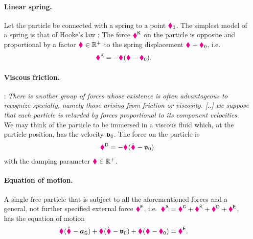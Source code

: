 \paragraph{Linear spring.}
Let the particle be connected with a spring to a point $\particlePos{0}$.
The simplest model of a spring is that of Hooke's law \cite{Hooke:OfSprings}: The force $\particleForceStiff{}$ on the particle is opposite and proportional by a factor $\particleStiffness{} \in \RealNum^+$ to the spring displacement $\particlePos{} - \particlePos{0}$, i.e.\
\begin{align}\label{eq:ParticleStiffness}
 \particleForceStiff{} &= -\particleStiffness{} (\particlePos{} - \particlePos{0}).
\end{align}

\paragraph{Viscous friction.}
\cite[§81]{Rayleigh:TheoryOfSound}: \textit{There is another group of forces whose existence is often advantageous to recognize specially, namely those arising from friction or viscosity. [..] we suppose that each particle is retarded by forces proportional to its component velocities.}
We may think of the particle to be immersed in a viscous fluid which, at the particle position, has the velocity $\tuple{\mathfrak{v}}_0$.
The force on the particle is
\begin{align}\label{eq:ParticleDamping}
 \particleForceDiss{} = -\particleDamping{} (\particlePosd{} - \tuple{\mathfrak{v}}_0)
\end{align}
with the damping parameter $\particleDamping{} \in \RealNum^+$.

\paragraph{Equation of motion.}
A single free particle that is subject to all the aforementioned forces and a general, not further specified external force $\particleForceEx{}$, i.e.\ $\particleForceImpressed{} = \particleForceGravity{} + \particleForceStiff{} + \particleForceDiss{} + \particleForceEx{}$, has the equation of motion 
\begin{align}\label{eq:ParticleEoM}
 \particleMass{} (\particlePosdd{} - \gravityAcc) + \particleDamping{} (\particlePosd{} - \tuple{\mathfrak{v}}_0) + \particleStiffness{} (\particlePos{} - \particlePos{0}) &= \particleForceEx{}.
\end{align}

